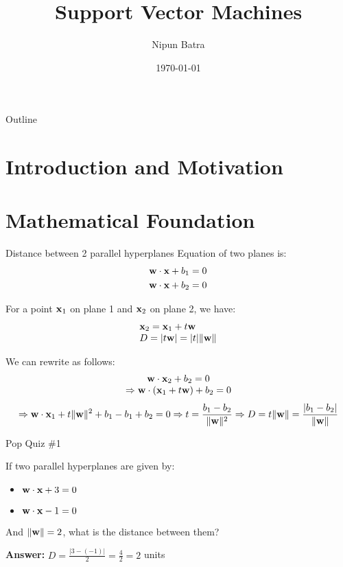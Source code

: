 \documentclass{beamer}
\title{Support Vector Machines}
\date{\today}
\author{Nipun Batra}
\institute{IIT Gandhinagar}
\begin{document}
\maketitle

\begin{frame}{Outline}
\tableofcontents
\end{frame}


\section{Introduction and Motivation}

{
	
}

\section{Mathematical Foundation}

\begin{frame}{Distance between 2 parallel hyperplanes}
Equation of two planes is:
$$
\begin{aligned}
&\mathbf{w}\cdot \mathbf{x}+b_1=0\\
&\mathbf{w}\cdot \mathbf{x}+b_2=0
\end{aligned}
$$

\pause For a point $\mathbf{x}_1$ on plane 1 and $\mathbf{x}_2$ on plane 2, we have:
\pause $$
\begin{array}{l}
{\mathbf{x}_{2}=\mathbf{x}_{1}+t \mathbf{w}} \\
{D=|t \mathbf{w}|=|t|\|\mathbf{w}\|}
\end{array}
$$

\pause We can rewrite as follows:
\pause $$
\begin{array}{c}
{\mathbf{w}\cdot \mathbf{x}_{2}+b_{2}=0} \\
{\Rightarrow \mathbf{w} \cdot\left(\mathbf{x}_{1}+t \mathbf{w}\right)+b_{2}=0}
\end{array}
$$
\pause $$
\Rightarrow \mathbf{w} \cdot \mathbf{x}_{1}+t\|\mathbf{w}\|^{2}+b_1-b_1+b_2 = 0
\Rightarrow t = \frac{b_1 - b_2}{\|\mathbf{w}\|^{2}}  \Rightarrow D = t\|\mathbf{w}\| =  \frac{|b_1 - b_2|}{\|\mathbf{w}\|}
$$
\end{frame}

\begin{frame}{Pop Quiz \#1}
\begin{tcolorbox}[colback=blue!5!white,colframe=blue!75!black,title=Quick Question!]
If two parallel hyperplanes are given by:
\begin{itemize}
	\item $\mathbf{w} \cdot \mathbf{x} + 3 = 0$
	\item $\mathbf{w} \cdot \mathbf{x} - 1 = 0$
\end{itemize}
And $\|\mathbf{w}\| = 2$, what is the distance between them?

\pause
\textbf{Answer:} $D = \frac{|3 - (-1)|}{2} = \frac{4}{2} = 2$ units
\end{tcolorbox}
\end{frame}
\end{document}
